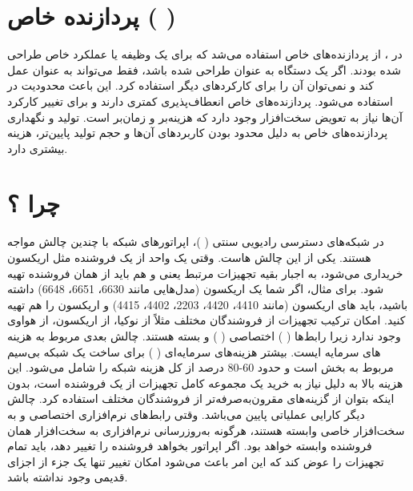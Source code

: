 \documentclass[landscape, 12pt]{report}
\begin{document}
 	         
\section*{پردازنده خاص  (
	)}
	در 
	، از پردازنده‌های خاص استفاده می‌شد که برای یک وظیفه یا عملکرد خاص طراحی شده بودند. اگر یک دستگاه به عنوان 
	 طراحی شده باشد، فقط می‌تواند به عنوان 
	 عمل کند و نمی‌توان آن را برای کارکردهای دیگر استفاده کرد. این باعث محدودیت در استفاده می‌شود. پردازنده‌های خاص انعطاف‌پذیری کمتری دارند و برای تغییر کارکرد آن‌ها نیاز به تعویض سخت‌افزار وجود دارد که هزینه‌بر و زمان‌بر است. تولید و نگهداری پردازنده‌های خاص به دلیل محدود بودن کاربردهای آن‌ها و حجم تولید پایین‌تر، هزینه بیشتری دارد.
	 
	 
\section*{چرا 
	 ؟}
	در شبکه‌های دسترسی رادیویی سنتی (
	)، اپراتورهای شبکه با چندین چالش مواجه هستند.
	  یکی از این چالش هاست. وقتی یک واحد
	    از یک فروشنده مثل اریکسون خریداری می‌شود، به اجبار بقیه تجهیزات مرتبط یعنی
	      و
	        هم باید از همان فروشنده تهیه شود. برای مثال، اگر شما یک
	         اریکسون (مدل‌هایی مانند 6630، 6651، 6648) داشته باشید، باید
	          های اریکسون (مانند 4410، 4420، 2203، 4402، 4415) و
	            اریکسون را هم تهیه کنید. امکان ترکیب تجهیزات از فروشندگان مختلف مثلاً
	              از نوکیا،
	                از اریکسون،
	                  از هواوی وجود ندارد زیرا رابط‌ها (
	                  )  اختصاصی (
) و بسته هستند. چالش بعدی مربوط به هزینه های سرمایه ایست. بیشتر هزینه‌های سرمایه‌ای (
) برای ساخت یک شبکه بی‌سیم مربوط به بخش 
 است و حدود 60-80 درصد از کل هزینه شبکه را شامل می‌شود. این هزینه بالا به دلیل نیاز به خرید یک مجموعه کامل تجهیزات از یک فروشنده است، بدون اینکه بتوان از گزینه‌های مقرون‌به‌صرفه‌تر از فروشندگان مختلف استفاده کرد. چالش دیگر کارایی عملیاتی پایین می‌باشد. وقتی رابط‌های نرم‌افزاری اختصاصی و به سخت‌افزار خاصی وابسته هستند، هرگونه به‌روزرسانی نرم‌افزاری به سخت‌افزار همان فروشنده وابسته خواهد بود. اگر اپراتور بخواهد فروشنده را تغییر دهد، باید تمام تجهیزات را عوض کند که این امر باعث می‌شود امکان تغییر تنها یک جزء از اجزای
   قدیمی وجود نداشته باشد.
   
\end{document}
